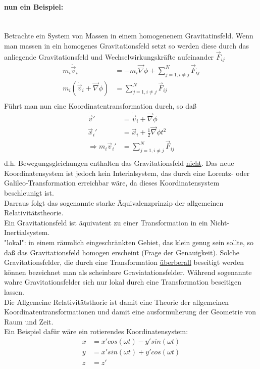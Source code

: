 \documentclass[a4paper]{article}
\begin{document}
\paragraph{nun ein Beispiel:}\\
Betrachte ein System von Massen in einem homogenenem Gravitatinsfeld.
Wenn man massen in ein homogenes Gravitationsfeld setzt so werden diese durch
das anliegende Gravitationsfeld und Wechselwirkungskräfte aufeinander
$\vec{F}_{ij}$
\begin{align}
m_i \dot{\vec{v}}_i&=-m_i\vec{\nabla}\phi+\sum_{j=1,i\neq j}^N\vec{F}_{ij}\\
m_i (\dot{\vec{v}}_i+\vec{\nabla}\phi)&=\sum_{j=1,i\neq j}^N\vec{F}_{ij}\\
\end{align}
Führt man nun eine Koordinatentransformation durch, so daß
\begin{align}
\dot{\vec{v}}{}'&=\dot{\vec{v}}_i+\vec{\nabla}\phi\\
\vec{x}_i{}'&=\vec{x}_i+\frac{1}{2}\vec{\nabla}\phi t^2\\
\Rightarrow m_i\vec{v}_i{}'&=\sum_{j=1,i\neq j}^N\vec{F}_{ij}\\
\end{align}
d.h. Bewegungsgleichungen enthalten das Gravitationsfeld \underline{nicht}. Das
neue Koordinatensystem ist jedoch kein Interialsystem, das durch eine
Lorentz- oder Galileo-Transformation erreichbar wäre, da dieses
Koordinatensystem beschleunigt ist.\\
Darraus folgt das sogenannte starke Äquivalenzprinzip der allgemeinen
Relativitätstheorie.\\
Ein Gravitationsfeld ist äquivatent zu einer Transformation in ein
Nicht- Inertialsystem.\\
"lokal": in einem räumlich eingeschränkten Gebiet, das klein genug sein sollte,
so daß das Gravitationsfeld homogen erscheint (Frage der Genauigkeit).
Solche Gravitationsfelder, die durch eine Transformation \underline{überberall}
beseitigt werden können bezeichnet man als scheinbare Graviatationsfelder.
Während sogenannte wahre Gravitationsfelder sich nur lokal durch eine
Transformation beseitigen lassen.\\
Die Allgemeine Relativitätsthorie ist damit eine Theorie der allgemeinen
Koordinatentransformationen und damit eine ausformulierung der Geometrie von
Raum und Zeit.\\ 
Ein Beispiel dafür wäre ein rotierendes Koordinatensystem:
\begin{align}
x&=x'cos(\omega t)-y'sin(\omega t)\\
y&=x'sin(\omega t)+y'cos(\omega t)\\
z&=z'
\end{align}
\end{document}
